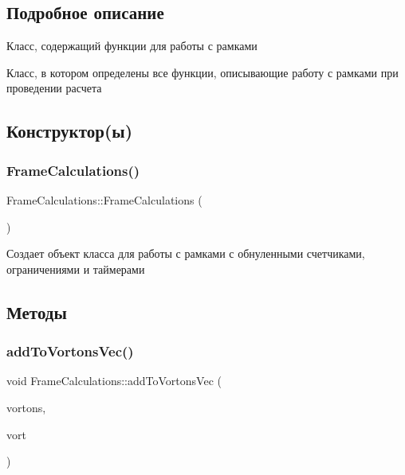 \subsection{Подробное описание}
Класс, содержащий функции для работы с рамками 

Класс, в котором определены все функции, описывающие работу с рамками при проведении расчета 

\subsection{Конструктор(ы)}
\mbox{\label{class_frame_calculations_a4175dc61a498d4b905abb48e0e202052}} 
\subsubsection{\texorpdfstring{Frame\+Calculations()}{FrameCalculations()}}
{\footnotesize\ttfamily Frame\+Calculations\+::\+Frame\+Calculations (\begin{DoxyParamCaption}{ }\end{DoxyParamCaption})}

Создает объект класса для работы с рамками с обнуленными счетчиками, ограничениями и таймерами 

\subsection{Методы}
\mbox{\label{class_frame_calculations_aefef30822ffab57ba2a36750470a9589}} 
\subsubsection{\texorpdfstring{add\+To\+Vortons\+Vec()}{addToVortonsVec()}}
{\footnotesize\ttfamily void Frame\+Calculations\+::add\+To\+Vortons\+Vec (\begin{DoxyParamCaption}\item[{Q\+Vector$<$ \mbox{\hyperlink{class_vorton}{Vorton}} $>$ \&}]{vortons,  }\item[{const \mbox{\hyperlink{class_vorton}{Vorton}}}]{vort }\end{DoxyParamCaption})\hspace{0.3cm}{\ttfamily [static]}}

